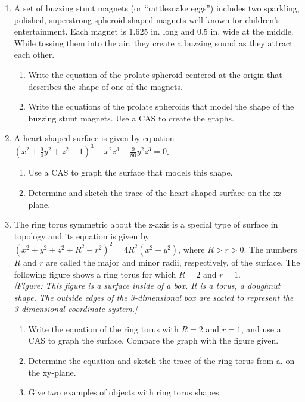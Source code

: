\documentclass{exercises}
\begin{document}
\begin{enumerate}[resume]
\begin{enumerate}[label=(\alph*)]
  \item Sketch the graph.
  \item Find an equation of the intersection curve of the surface with plane $z=1000$ that is parallel to the xy-plane. The intersection curve is called a parallel.
  \item Find an equation of the intersection curve of the surface with plane $x+y=0$ that passes through the z-axis. The intersection curve is called a meridian.
\end{enumerate}
\item \techrequired A set of buzzing stunt magnets (or ``rattlesnake eggs'') includes two sparkling, polished, superstrong spheroid-shaped magnets well-known for children's entertainment. Each magnet is $1.625$ in. long and $0.5$ in. wide at the middle. While tossing them into the air, they create a buzzing sound as they attract each other.
\begin{enumerate}[label=(\alph*)]
  \item Write the equation of the prolate spheroid centered at the origin that describes the shape of one of the magnets.
  \item Write the equations of the prolate spheroids that model the shape of the buzzing stunt magnets. Use a CAS to create the graphs.
\end{enumerate}
\item \techrequired A heart-shaped surface is given by equation ${(x^{2}+\frac{9}{4}y^{2}+z^{2}-1)}^{3}-x^{2}z^{3}-\frac{9}{80}y^{2}z^{3}=0$.
\begin{enumerate}[label=(\alph*)]
  \item Use a CAS to graph the surface that models this shape.
  \item Determine and sketch the trace of the heart-shaped surface on the xz-plane.
\end{enumerate}
\item \techrequired The ring torus symmetric about the z-axis is a special type of surface in topology and its equation is given by ${(x^{2}+y^{2}+z^{2}+R^{2}-r^{2})}^{2}=4R^{2}(x^{2}+y^{2})$, where $R>r>0$. The numbers $R$ and $r$ are called the major and minor radii, respectively, of the surface. The following figure shows a ring torus for which $R=2$ and $r=1$. \\ \textit{[Figure: This figure is a surface inside of a box. It is a torus, a doughnut shape. The outside edges of the 3-dimensional box are scaled to represent the 3-dimensional coordinate system.]}
\begin{enumerate}[label=(\alph*)]
  \item Write the equation of the ring torus with $R=2$ and $r=1$, and use a CAS to graph the surface. Compare the graph with the figure given.
  \item Determine the equation and sketch the trace of the ring torus from a. on the xy-plane.
  \item Give two examples of objects with ring torus shapes.
\end{enumerate}
\end{enumerate}
\end{document}
